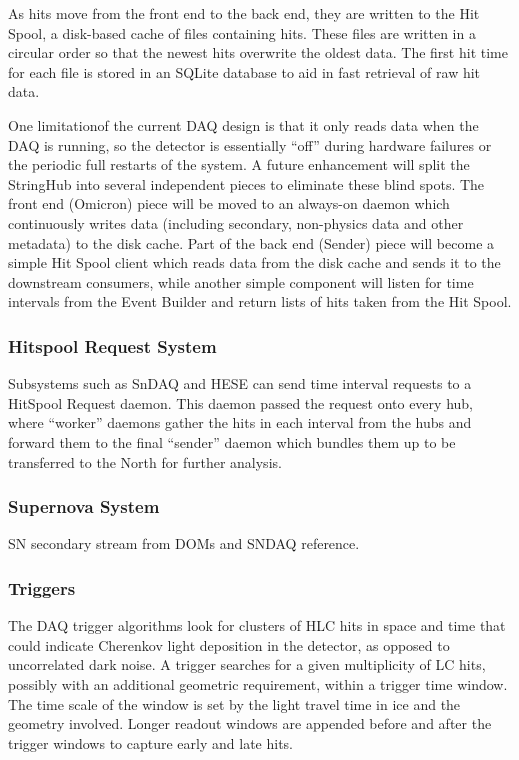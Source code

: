 As hits move from the front end to the back end, they are written to the
Hit Spool, a disk-based cache of files containing hits.  These files are
written in a circular order so that the newest hits overwrite the oldest data.
The first hit time for each file is stored in an SQLite database to aid in fast
retrieval of raw hit data.

One limitationof the current DAQ design is that it only reads data when the
DAQ is running, so the detector is essentially ``off'' during hardware failures
or the periodic full restarts of the system.  A future enhancement will split
the StringHub into several independent pieces to eliminate these blind spots.
The front end (Omicron) piece will be moved to an always-on daemon which
continuously writes data (including secondary, non-physics data and other
metadata) to the disk cache.  Part of the back end (Sender) piece will become a
simple Hit Spool client which reads data from the disk cache and sends it to
the downstream consumers, while another simple component will listen for time
intervals from the Event Builder and return lists of hits taken from the
Hit Spool.

\subsubsection{Hitspool Request System}

Subsystems such as SnDAQ and HESE can send time interval requests to a HitSpool
Request daemon. This daemon passed the request onto every hub,
where ``worker'' daemons gather the hits in each interval from the hubs
and forward them to the
final ``sender'' daemon which bundles them up to be transferred to the
North
for further analysis.

\subsubsection{Supernova System}

SN secondary stream from DOMs and SNDAQ reference.

\subsubsection{\label{sect:online:trigger}Triggers}

The DAQ trigger algorithms look for clusters of HLC hits in space and time
that could indicate Cherenkov light deposition in the detector, as opposed
to uncorrelated dark noise.  A trigger searches for a given multiplicity of
LC hits, possibly with an additional geometric requirement, within a trigger time window.  The time scale of the
window is set by the light travel time in ice and the geometry involved.
Longer readout windows 
are appended before and after the trigger windows to capture early and late
hits.


